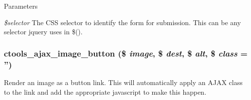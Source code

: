 \begin{DoxyParams}{Parameters}
\item[{\em \$selector}]The CSS selector to identify the form for submission. This can be any selector jquery uses in \$(). \end{DoxyParams}
\hypertarget{profiles_2dosomething_2modules_2contrib_2ctools_2includes_2ajax_8inc_a00499a965fd0a192af2106a400c0e140}{
\subsubsection[{ctools\_\-ajax\_\-image\_\-button}]{\setlength{\rightskip}{0pt plus 5cm}ctools\_\-ajax\_\-image\_\-button (\$ {\em image}, \/  \$ {\em dest}, \/  \$ {\em alt}, \/  \$ {\em class} = {\ttfamily ''})}}
\label{profiles_2dosomething_2modules_2contrib_2ctools_2includes_2ajax_8inc_a00499a965fd0a192af2106a400c0e140}
Render an image as a button link. This will automatically apply an AJAX class to the link and add the appropriate javascript to make this happen.


